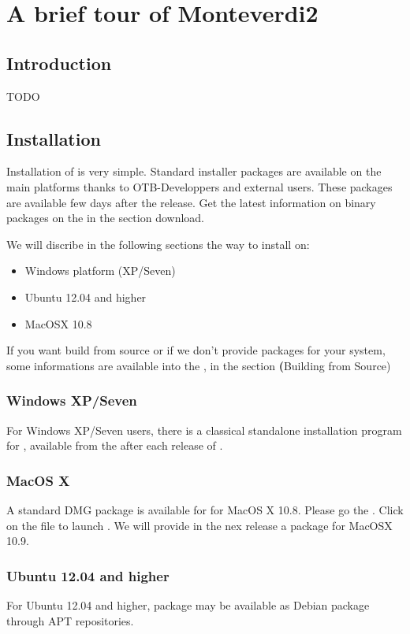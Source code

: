 \chapter{A brief tour of Monteverdi2}\label{chap:Monteverdi2} 

\section{Introduction}\label{sec:montintro}
TODO 

\section{Installation}\label{sec:montinstall} 
  
Installation of \montNew is very simple. Standard installer packages are available on the main platforms thanks to OTB-Developpers and external users. These packages are available few days after the release. Get the latest information on binary packages on the \website in the section download.

We will discribe in the following sections the way to install \montNew on:
\begin{itemize}
\item Windows platform (XP/Seven)
\item Ubuntu 12.04 and higher
\item MacOSX 10.8
\end{itemize}

If you want build from source or if we don't provide packages for your system, some informations are available into the \sg, in the section \textbf(Building from Source)

\subsection{Windows XP/Seven}
For Windows XP/Seven users, there is a classical standalone installation program for \montNew, available from the \download after each release of \montNew. 

\subsection{MacOS X}
A standard DMG package is available for \montNew for MacOS X 10.8. Please go the \download.
Click on the file to launch \montNew. We will provide in the nex release a package for MacOSX 10.9.

\subsection{Ubuntu 12.04 and higher}
For Ubuntu 12.04 and higher, \montNew package may be available as Debian package through APT repositories.


